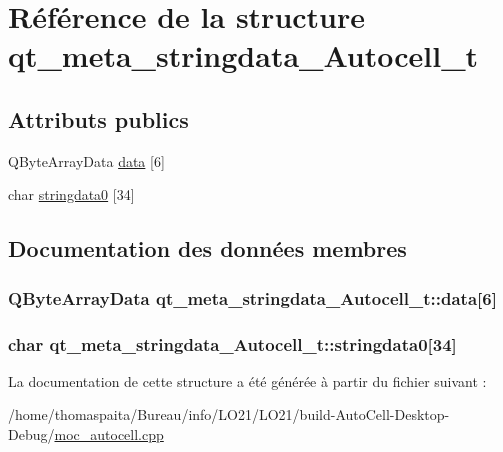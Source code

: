 \hypertarget{structqt__meta__stringdata___autocell__t}{}\section{Référence de la structure qt\+\_\+meta\+\_\+stringdata\+\_\+\+Autocell\+\_\+t}
\label{structqt__meta__stringdata___autocell__t}
\subsection*{Attributs publics}
\begin{DoxyCompactItemize}
\item 
Q\+Byte\+Array\+Data \hyperlink{structqt__meta__stringdata___autocell__t_ab2d545bf60d06da38f2e04f582a880ae}{data} \mbox{[}6\mbox{]}
\item 
char \hyperlink{structqt__meta__stringdata___autocell__t_aacd0730b3ef21589a31099e0bffbec58}{stringdata0} \mbox{[}34\mbox{]}
\end{DoxyCompactItemize}


\subsection{Documentation des données membres}
\subsubsection[{\texorpdfstring{data}{data}}]{\setlength{\rightskip}{0pt plus 5cm}Q\+Byte\+Array\+Data qt\+\_\+meta\+\_\+stringdata\+\_\+\+Autocell\+\_\+t\+::data\mbox{[}6\mbox{]}}\hypertarget{structqt__meta__stringdata___autocell__t_ab2d545bf60d06da38f2e04f582a880ae}{}\label{structqt__meta__stringdata___autocell__t_ab2d545bf60d06da38f2e04f582a880ae}
\subsubsection[{\texorpdfstring{stringdata0}{stringdata0}}]{\setlength{\rightskip}{0pt plus 5cm}char qt\+\_\+meta\+\_\+stringdata\+\_\+\+Autocell\+\_\+t\+::stringdata0\mbox{[}34\mbox{]}}\hypertarget{structqt__meta__stringdata___autocell__t_aacd0730b3ef21589a31099e0bffbec58}{}\label{structqt__meta__stringdata___autocell__t_aacd0730b3ef21589a31099e0bffbec58}


La documentation de cette structure a été générée à partir du fichier suivant \+:\begin{DoxyCompactItemize}
\item 
/home/thomaspaita/\+Bureau/info/\+L\+O21/\+L\+O21/build-\/\+Auto\+Cell-\/\+Desktop-\/\+Debug/\hyperlink{moc__autocell_8cpp}{moc\+\_\+autocell.\+cpp}\end{DoxyCompactItemize}
